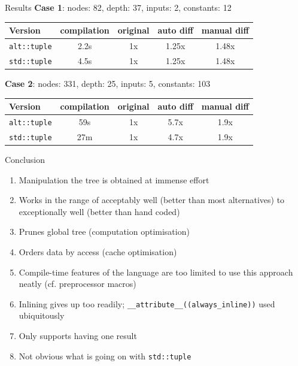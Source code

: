 \documentclass[xcolor=dvipsnames]{beamer}
\begin{document}
\begin{frame}[fragile]{Results}
\textbf{Case 1}: nodes: 82, depth: 37, inputs: 2, constants: 12
\begin{table}
\begin{tabular}{l | c | c | c | c }
Version & compilation & original & auto diff & manual diff \\
\hline \hline
\texttt{alt::tuple} & 2.2s & 1x & 1.25x & 1.48x \\
\texttt{std::tuple} & 4.5s & 1x & 1.25x & 1.48x \\
\end{tabular}
\end{table}
\vspace{10mm}
\textbf{Case 2}: nodes: 331, depth: 25, inputs: 5, constants: 103
\begin{table}
\begin{tabular}{l | c | c | c | c }
Version & compilation & original & auto diff & manual diff \\
\hline \hline
\texttt{alt::tuple} & 59s & 1x & 5.7x & 1.9x \\
\texttt{std::tuple} & 27m & 1x & 4.7x & 1.9x \\
\end{tabular}
\end{table}
\end{frame}


\begin{frame}[fragile]{Conclusion}
  \begin{enumerate}
  \item Manipulation the tree is obtained at immense effort \vspace{3mm}
  \item Works in the range of acceptably well (better than most alternatives) to exceptionally well (better than hand coded) \vspace{3mm}
  \item Prunes global tree (computation optimisation) \vspace{3mm}
  \item Orders data by access (cache optimisation) \vspace{3mm}
  \item Compile-time features of the language are too limited to use this approach neatly (cf. preprocessor macros) \vspace{3mm}
  \item Inlining gives up too readily; \verb$__attribute__((always_inline))$ used ubiquitously \vspace{3mm}
  \item Only supports having one result \vspace{3mm}
  \item Not obvious what is going on with \verb$std::tuple$ \vspace{3mm}
  \end{enumerate}
\end{frame}
\end{document}
